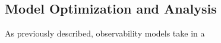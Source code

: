 \subsection{Model Optimization and Analysis}

As previously described, observability models take in a 

\subsubsection{}